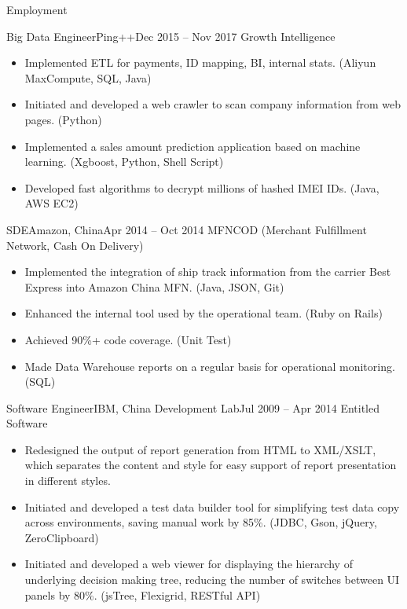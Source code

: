 \documentclass[]{mcdowellcv}
\begin{document}
	\makeheader
	
	\begin{cvsection}{Employment}
		\begin{cvsubsection}{Big Data Engineer}{Ping++}{Dec 2015 – Nov 2017}
			Growth Intelligence
			\begin{itemize}
				\item Implemented ETL for payments, ID mapping, BI, internal stats. (Aliyun MaxCompute, SQL, Java)
				\item Initiated and developed a web crawler to scan company information from web pages. (Python)
				\item Implemented a sales amount prediction application based on machine learning. (Xgboost, Python, Shell Script)
				\item Developed fast algorithms to decrypt millions of hashed IMEI IDs. (Java, AWS EC2)
			\end{itemize}
		\end{cvsubsection}
		
		\begin{cvsubsection}{SDE}{Amazon, China}{Apr 2014 – Oct 2014}
			MFNCOD (Merchant Fulfillment Network, Cash On Delivery)
			\begin{itemize}
				\item Implemented the integration of ship track information from the carrier Best Express into Amazon China MFN. (Java, JSON, Git)
				\item Enhanced the internal tool used by the operational team. (Ruby on Rails)
				\item Achieved 90\%+ code coverage. (Unit Test)
				\item Made Data Warehouse reports on a regular basis for operational monitoring. (SQL)
			\end{itemize}
		\end{cvsubsection}
		
		\begin{cvsubsection}{Software Engineer}{IBM, China Development Lab}{Jul 2009 – Apr 2014}
			Entitled Software
			\begin{itemize}
				\item Redesigned the output of report generation from HTML to XML/XSLT, which separates the content and style for easy support of report presentation in different styles.
				\item Initiated and developed a test data builder tool for simplifying test data copy across environments, saving manual work by 85\%. (JDBC, Gson, jQuery, ZeroClipboard)
				\item Initiated and developed a web viewer for displaying the hierarchy of underlying decision making tree, reducing the number of switches between UI panels by 80\%. (jsTree, Flexigrid, RESTful API)
			\end{itemize}
		\end{cvsubsection}
	\end{cvsection}
	
\end{document}
